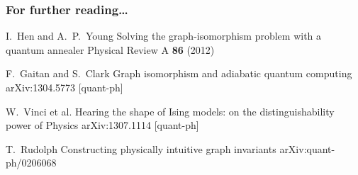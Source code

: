 \documentclass{beamer}
\begin{document}
\begin{frame}
  \frametitle{For further reading\ldots}
    
  \begin{thebibliography}{10}
    
  \beamertemplatearticlebibitems

    I.~Hen and A.~P.~Young
    \newblock Solving the graph-isomorphism problem with a quantum annealer
    \newblock Physical Review A {\bf 86} (2012)
    
    F.~Gaitan and S.~Clark
    \newblock Graph isomorphism and adiabatic quantum computing
    \newblock arXiv:1304.5773 [quant-ph]

    W.~Vinci et al.
    \newblock Hearing the shape of Ising models: on the distinguishability
    power of Physics
    \newblock arXiv:1307.1114 [quant-ph]

    T.~Rudolph
    \newblock Constructing physically intuitive graph invariants
    \newblock arXiv:quant-ph/0206068
  \end{thebibliography}
\end{frame}
\end{document}
